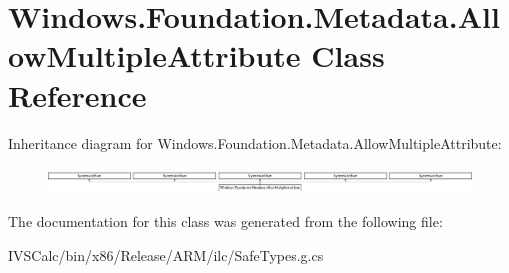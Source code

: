 \hypertarget{class_windows_1_1_foundation_1_1_metadata_1_1_allow_multiple_attribute}{}\section{Windows.\+Foundation.\+Metadata.\+Allow\+Multiple\+Attribute Class Reference}
\label{class_windows_1_1_foundation_1_1_metadata_1_1_allow_multiple_attribute}
Inheritance diagram for Windows.\+Foundation.\+Metadata.\+Allow\+Multiple\+Attribute\+:\begin{figure}[H]
\begin{center}
\leavevmode
\includegraphics[height=0.702194cm]{class_windows_1_1_foundation_1_1_metadata_1_1_allow_multiple_attribute}
\end{center}
\end{figure}


The documentation for this class was generated from the following file\+:\begin{DoxyCompactItemize}
\item 
I\+V\+S\+Calc/bin/x86/\+Release/\+A\+R\+M/ilc/Safe\+Types.\+g.\+cs\end{DoxyCompactItemize}
